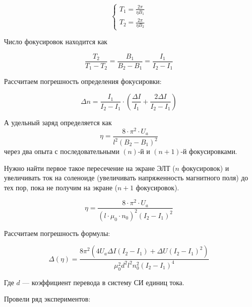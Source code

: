\begin{equation}
	\begin{cases}
		T_1=\frac{2\pi}{\eta{}B_1}\\
		T_2=\frac{2\pi}{\eta{}B_2}
	\end{cases}	
\end{equation}

Число фокусировок находится как 

\begin{equation}
	\label{eq:n}%
	\frac{T_2}{T_1-T_2}=\frac{B_1}{B_2-B_1}=\frac{I_1}{I_2-I_1}	
\end{equation}

Рассчитаем погрешность определения фокусировки:

\begin{equation}
	\label{eq:delta_n}%
	\Delta{n}=\frac{I_1}{I_2-I_1}\cdot\left(\frac{\Delta{I}}{I_1}+\frac{2\Delta{I}}{I_2-I_1}\right)	
\end{equation}

А удельный заряд определяется как %
%
\begin{equation}
	\eta=\frac{8\cdot\pi^2\cdot{}U_a}{l^2(B_2-B_1)^2}
\end{equation}
%
через два опыта с последовательными $(n)$-й и $(n+1)$-й фокусировками.

Нужно найти первое такое пересечение на экране ЭЛТ ($n$ фокусировок) и увеличивать ток на соленоиде (увеличивать напряженность магнитного поля) до тех пор, пока не получим на экране ($n+1$ фокусировок).

\begin{equation}
	\eta=\frac{8\cdot\pi^2\cdot{}U_a}{(l\cdot\mu_0\cdot{n_0})^2(I_2-I_1)^2}
\end{equation}

Рассчитаем погрешность формулы:

\begin{equation}
	\Delta{(\eta)}=\frac{8 \pi^{2} \left(4 U_{a} \Delta{I} \left(I_{2} - I_{1}\right) + \Delta{U} \left(I_{2} - I_{1}\right)^{2}\right)}{\mu_{0}^{2} d^{2} l^{2} n_{0}^{2} \left(I_{2} - I_{1}\right)^{4}}
\end{equation}

Где $d$ --- коэффициент перевода в систему СИ единиц тока.

Провели ряд экспериментов: 

